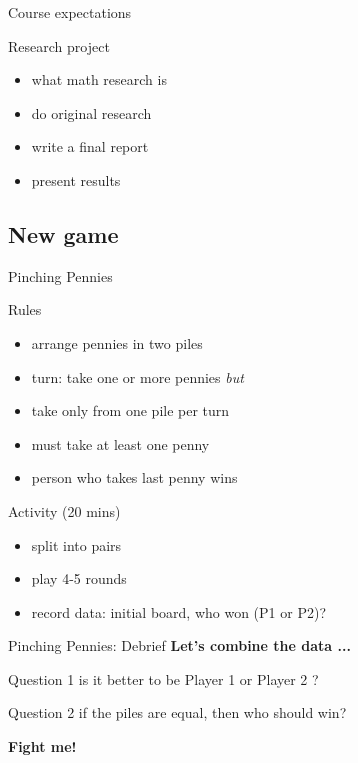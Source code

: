 \documentclass{beamer}
\begin{document}
\begin{frame}{Course expectations}
\pause
  \begin{block}{Research project}
    \begin{itemize}
\pause
      \item what math research is
\pause
      \item do original research
\pause
      \item write a final report
\pause
      \item present results
    \end{itemize}
  \end{block}
\end{frame}

\subsection{New game}
\begin{frame}{Pinching Pennies}
\pause
  \begin{block}{Rules}
    \begin{itemize}
\pause
      \item arrange pennies in two piles
\pause
      \item turn: take one or more pennies \emph{but}
\pause
      \item take only from one pile per turn
\pause
      \item must take at least one penny
\pause
      \item person who takes last penny wins
    \end{itemize}
  \end{block}
\pause
  \begin{block}{Activity (20 mins)}
    \begin{itemize}
\pause
      \item split into pairs
\pause
      \item play 4-5 rounds
\pause
      \item {\color{red}record data:} initial board, who won (P1 or P2)? 
    \end{itemize}
  \end{block}
\end{frame}

\begin{frame}{Pinching Pennies: Debrief}
\pause
\textbf{Let's combine the data ...}
\pause
  \begin{block}{Question 1}
     is it better to be {\color{blue}Player 1} or {\color{red}Player 2} ?
  \end{block}
\pause
  \begin{block}{Question 2}
     if the piles are equal, then who should win?
  \end{block}
\pause
\begin{center}
\textbf{Fight me!}
\end{center}
\end{frame}
\end{document}

